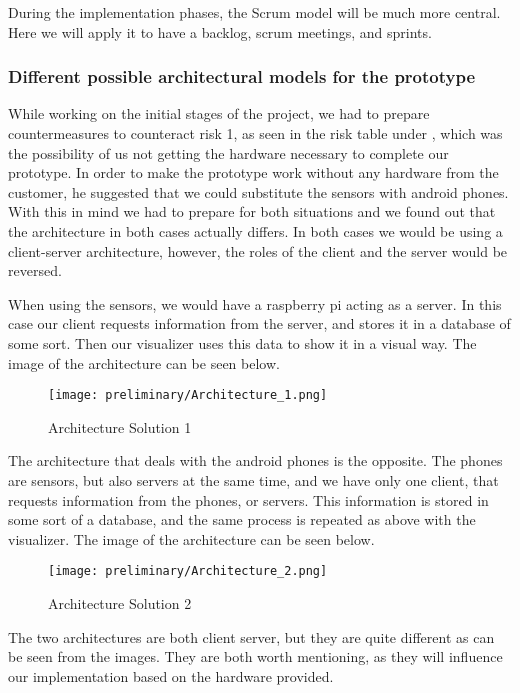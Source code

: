 \documentclass[../document]{subfiles}
\begin{document}
During the implementation phases, the Scrum model will be much more central. Here we will apply it to have a backlog, scrum meetings, and sprints.

\subsubsection{Different possible architectural models for the prototype}
While working on the initial stages of the project, we had to prepare countermeasures to counteract risk 1, as seen in the risk table under , which was the possibility of us not getting the hardware necessary to complete our prototype. In order to make the prototype work without any hardware from the customer, he suggested that we could substitute the sensors with android phones. With this in mind we had to prepare for both situations and we found out that the architecture in both cases actually differs. In both cases we would be using a client-server architecture, however, the roles of the client and the server would be reversed.

When using the sensors, we would have a raspberry pi acting as a server. In this case our client requests information from the server, and stores it in a database of some sort. Then our visualizer uses this data to show it in a visual way. The image of the architecture can be seen below.

\begin{figure}[H]
	\texttt{[image: preliminary/Architecture\_1.png]}
	\caption{Architecture Solution 1}
\end{figure}

The architecture that deals with the android phones is the opposite. The phones are sensors, but also servers at the same time, and we have only one client, that requests information from the phones, or servers. This information is stored in some sort of a database, and the same process is repeated as above with the visualizer. The image of the architecture can be seen below.

\begin{figure}[H]
	\texttt{[image: preliminary/Architecture\_2.png]}
	\caption{Architecture Solution 2}
\end{figure}

The two architectures are both client server, but they are quite different as can be seen from the images. They are both worth mentioning, as they will influence our implementation based on the hardware provided.
\end{document}
